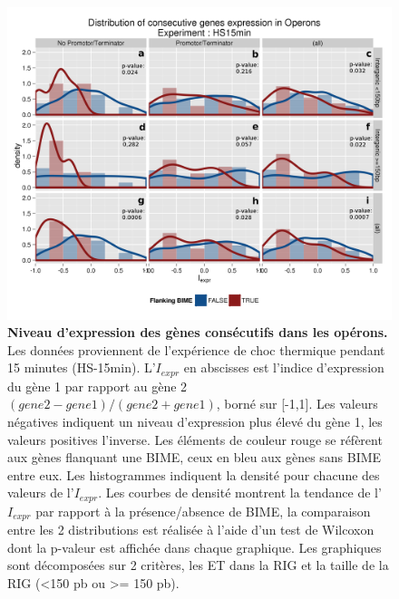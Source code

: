 \documentclass[12pt,a4paper]{report}
\begin{document}
\begin{onehalfspace}
\begin{figure}[!h]
\centerline{\includegraphics[scale=0.82]{figures/genesOperon_histoDens.png}}
\caption{\textbf{Niveau d'expression des gènes consécutifs dans les opérons.} Les données proviennent de l'expérience de choc thermique pendant 15 minutes (HS-15min). L'$I_{expr}$ en abscisses est l'indice d'expression du gène 1 par rapport au gène 2 $(gene2 - gene1) / (gene2 + gene1)$, borné sur [-1,1]. Les valeurs négatives indiquent un niveau d'expression plus élevé du gène 1, les valeurs positives l'inverse. Les éléments de couleur rouge se réfèrent aux gènes flanquant une BIME, ceux en bleu aux gènes sans BIME entre eux. Les histogrammes indiquent la densité pour chacune des valeurs de l'$I_{expr}$. Les courbes de densité montrent la tendance de l'$I_{expr}$ par rapport à la présence/absence de BIME, la comparaison entre les 2 distributions est réalisée à l'aide d'un test de Wilcoxon dont la p-valeur est affichée dans chaque graphique. Les graphiques sont décomposées sur 2 critères, les ET dans la RIG et la taille de la RIG (<150 pb ou >= 150 pb).}
\label{fig:expression_operon}
\end{figure}


\end{onehalfspace}
\end{document}
